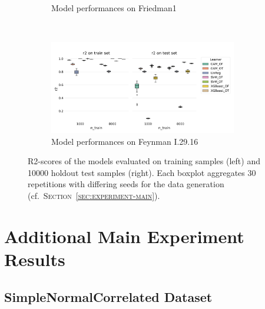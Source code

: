 \documentclass[runningheads]{llncs}
\begin{document}
\begin{figure}[h!]
\begin{subfigure}[b]{\textwidth}
        \caption{Model performances on Friedman1}
    \end{subfigure}
    \\[10pt]
    \vfill
    \begin{subfigure}[b]{\textwidth}
        \centering
        \includegraphics[width=0.9\textwidth]{img/model_performance_FeynmanI.29.16.png}
        \caption{Model performances on Feynman I.29.16}
    \end{subfigure}
    \caption{R2-scores of the models evaluated on training samples (left) and 10000 holdout test samples (right). Each boxplot aggregates 30 repetitions with differing seeds for the data generation (cf.\ \textsc{Section~\ref{sec:experiment-main}}).}
    \label{fig:model-performance}  %
\end{figure}

\clearpage
\section{Additional Main Experiment Results}\label{app:additional-results}

\subsection{SimpleNormalCorrelated Dataset}
\end{document}
